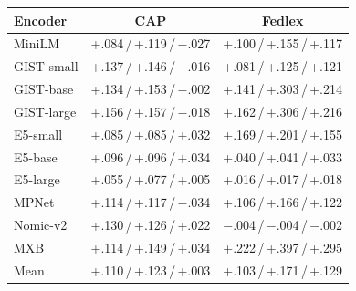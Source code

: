 \vspace{1pt}
\begin{tabular}{lcc}
\toprule
Encoder & \multicolumn{1}{c}{CAP} & \multicolumn{1}{c}{Fedlex} \\
\midrule
MiniLM & +.084\,/\,+.119\,/\,$-$.027 & +.100\,/\,+.155\,/\,+.117 \\
\addlinespace[1pt]
GIST-small & +.137\,/\,+.146\,/\,$-$.016 & +.081\,/\,+.125\,/\,+.121 \\
GIST-base & +.134\,/\,+.153\,/\,$-$.002 & +.141\,/\,+.303\,/\,+.214 \\
GIST-large & +.156\,/\,+.157\,/\,$-$.018 & +.162\,/\,+.306\,/\,+.216 \\
\addlinespace[1pt]
E5-small & +.085\,/\,+.085\,/\,+.032 & +.169\,/\,+.201\,/\,+.155 \\
E5-base & +.096\,/\,+.096\,/\,+.034 & +.040\,/\,+.041\,/\,+.033 \\
E5-large & +.055\,/\,+.077\,/\,+.005 & +.016\,/\,+.017\,/\,+.018 \\
\addlinespace[1pt]
MPNet & +.114\,/\,+.117\,/\,$-$.034 & +.106\,/\,+.166\,/\,+.122 \\
Nomic-v2 & +.130\,/\,+.126\,/\,+.022 & $-$.004\,/\,$-$.004\,/\,$-$.002 \\
MXB & +.114\,/\,+.149\,/\,+.034 & +.222\,/\,+.397\,/\,+.295 \\
\midrule
Mean & +.110\,/\,+.123\,/\,+.003 & +.103\,/\,+.171\,/\,+.129 \\
\bottomrule
\end{tabular}

